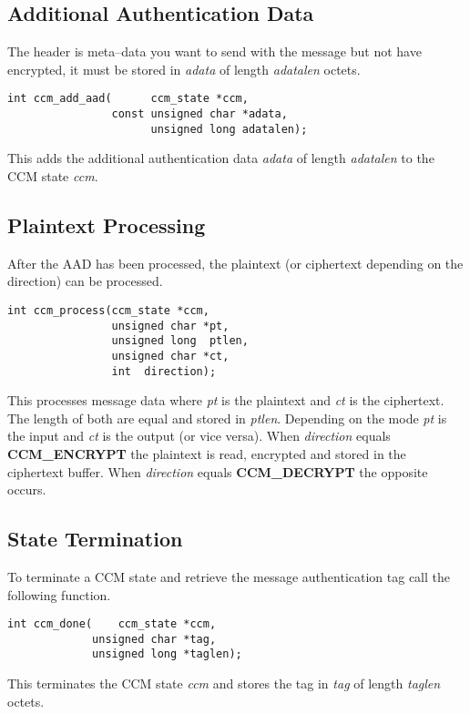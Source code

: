 \documentclass[synpaper]{book}
\begin{document}
\subsection{Additional Authentication Data}
The header is meta--data you want to send with the message but not have encrypted, it must be stored in \textit{adata} of length \textit{adatalen} octets.

\begin{verbatim}
int ccm_add_aad(      ccm_state *ccm,
                const unsigned char *adata,
                      unsigned long adatalen);
\end{verbatim}
This adds the additional authentication data \textit{adata} of length \textit{adatalen} to the CCM state \textit{ccm}.

\subsection{Plaintext Processing}
After the AAD has been processed, the plaintext (or ciphertext depending on the direction) can be processed.

\begin{verbatim}
int ccm_process(ccm_state *ccm,
                unsigned char *pt,
                unsigned long  ptlen,
                unsigned char *ct,
                int  direction);
\end{verbatim}
This processes message data where \textit{pt} is the plaintext and \textit{ct} is the ciphertext.  The length of both are equal and stored in \textit{ptlen}.  Depending on
the mode \textit{pt} is the input and \textit{ct} is the output (or vice versa).  When \textit{direction} equals \textbf{CCM\_ENCRYPT} the plaintext is read,
encrypted and stored in the ciphertext buffer.  When \textit{direction} equals \textbf{CCM\_DECRYPT} the opposite occurs.

\subsection{State Termination}
To terminate a CCM state and retrieve the message authentication tag call the following function.

\begin{verbatim}
int ccm_done(    ccm_state *ccm,
             unsigned char *tag,
             unsigned long *taglen);
\end{verbatim}
This terminates the CCM state \textit{ccm} and stores the tag in \textit{tag} of length \textit{taglen} octets.
\end{document}
